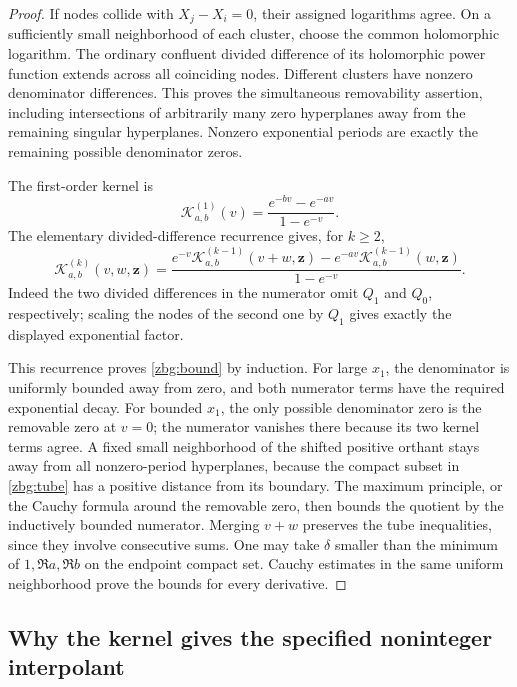 \documentclass[11pt,letterpaper]{article}
\numberwithin{equation}{section}
\theoremstyle{plain}
\theoremstyle{definition}
\theoremstyle{remark}
\begin{document}
\begin{proof}
If nodes collide with $X_j-X_i=0$, their assigned logarithms agree.
On a sufficiently small neighborhood of each cluster, choose the common
holomorphic logarithm.  The ordinary confluent divided difference of
its holomorphic power function extends across all coinciding nodes.
Different clusters have nonzero denominator differences.  This proves
the simultaneous removability assertion, including intersections of
arbitrarily many zero hyperplanes away from the remaining singular
hyperplanes. Nonzero exponential periods are
exactly the remaining possible denominator zeros.

The first-order kernel is
\[
 \mathscr K_{a,b}^{(1)}(v)=\frac{e^{-bv}-e^{-av}}{1-e^{-v}}.
\]
The elementary divided-difference recurrence gives, for $k\geq2$,
\begin{equation}\label{zbg:recurrence}
 \mathscr K_{a,b}^{(k)}(v,w,\boldsymbol z)=
 \frac{e^{-v}\mathscr K_{a,b}^{(k-1)}(v+w,\boldsymbol z)
       -e^{-av}\mathscr K_{a,b}^{(k-1)}(w,\boldsymbol z)}
      {1-e^{-v}}.
\end{equation}
Indeed the two divided differences in the numerator omit $Q_1$ and
$Q_0$, respectively; scaling the nodes of the second one by $Q_1$
gives exactly the displayed exponential factor.

This recurrence proves \eqref{zbg:bound} by induction.  For large
$x_1$, the denominator is uniformly bounded away from zero, and both
numerator terms have the required exponential decay.  For bounded
$x_1$, the only possible denominator zero is the removable zero at
$v=0$; the numerator vanishes there because its two kernel terms agree.  A fixed small neighborhood of the shifted positive orthant
stays away from all nonzero-period hyperplanes, because the compact
subset in \eqref{zbg:tube} has a positive distance from its boundary.
The maximum principle, or the Cauchy formula around the removable
zero, then bounds the quotient by the inductively bounded numerator.
Merging $v+w$ preserves the tube inequalities, since they involve
consecutive sums.  One may take $\delta$ smaller than the minimum of
$1,\Re a,\Re b$ on the endpoint compact set.  Cauchy estimates in the
same uniform neighborhood prove the bounds for every derivative.
\end{proof}

\subsection{Why the kernel gives the specified noninteger interpolant}
\end{document}
